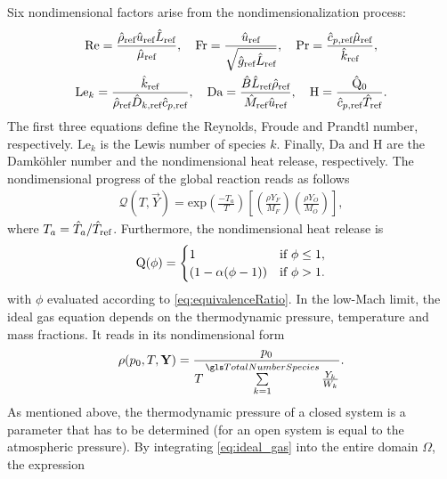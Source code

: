 Six nondimensional factors arise from the nondimensionalization process:
\begin{gather*}
	\text{Re} = \frac{\RefVal{\rho} \RefVal{u}  \RefVal{L}}{\RefVal{\Viscosity}}, \quad
	\text{Fr} = \frac{\RefVal{u}}{\sqrt{\RefVal{g}\RefVal{L}}}, \quad
	\text{Pr} = \frac{\RefValS{c}{p} \RefVal{\Viscosity}}{\RefVal{k}},\\%
	\text{Le}_k = \frac{\RefVal{k}}{\RefVal{\rho} \RefValS{D}{k} \RefValS{c}{p}}, \quad
	\Da = \frac{\hat B \RefVal{L} \RefVal{\rho}}{\RefVal{M}\RefVal{u}}, \quad \label{eq:Dahmkoeler}
	\text{H} = \frac{\hat \heatRelease_0}{\RefValS{c}{p} \RefVal{T}}.%
\end{gather*}
The first three equations define the Reynolds, Froude and Prandtl number, respectively. $\text{Le}_k$ is the Lewis number of species $k$. Finally, $\text{Da}$ and H are the Damköhler number and the nondimensional heat release, respectively. The nondimensional progress of the global reaction reads as follows
\begin{align}
	\mathcal{Q}(T, \vec{Y})  = \text{exp}\left(\frac{-T_a}{T}\right) \left[\left(\frac{\rho Y_F}{M_F}\right) \left(\frac{\rho Y_O}{M_O}\right)\right], \label{eq:NonDimArr}
\end{align}
where $T_a = \hat{T}_a / \hat T_{\text{ref}}$. Furthermore, the nondimensional heat release is
\begin{equation}
	\mathrm{Q}(\phi)=
	\begin{cases}
		1                     & \text{if}~ \phi \leq 1, \\
		(1 - \alpha(\phi -1)) & \text{if}~\phi > 1.
	\end{cases}  \label{eq:heatReleaseOneStepNonDim}
\end{equation}
with $\phi$ evaluated according to \cref{eq:equivalenceRatio}. In the low-Mach limit, the ideal gas equation depends on the thermodynamic pressure, temperature and mass fractions. It reads in its nondimensional form
\begin{align} \label{eq:ideal_gas}
	\rho(p_0,T, \vec{Y}) = \frac{p_0}{T \SumOvAllns \frac{Y_k}{W_k}}.
\end{align}
As mentioned above, the thermodynamic pressure of a closed system is a parameter that has to be determined (for an open system is equal to the atmospheric pressure). By integrating \cref{eq:ideal_gas} into the entire domain $\Omega$, the expression
